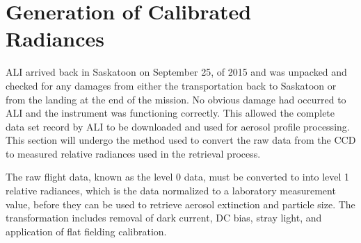 \section{Generation of Calibrated Radiances}
\label{sec:5.2:CalibratedRadiances}

ALI arrived back in Saskatoon on September 25, of 2015 and was unpacked and checked for any damages from either the transportation back to Saskatoon or from the landing at the end of the mission. No obvious damage had occurred to ALI and the instrument was functioning correctly. This allowed the complete data set record by ALI to be downloaded and used for aerosol profile processing. This section will undergo the method used to convert the raw data from the CCD to measured relative radiances used in the retrieval process.

The raw flight data, known as the level 0 data, must be converted to into level 1 relative radiances, which is the data normalized to a laboratory measurement value, before they can be used to retrieve aerosol extinction and particle size. The transformation includes removal of dark current, DC bias, stray light, and application of flat fielding calibration.


